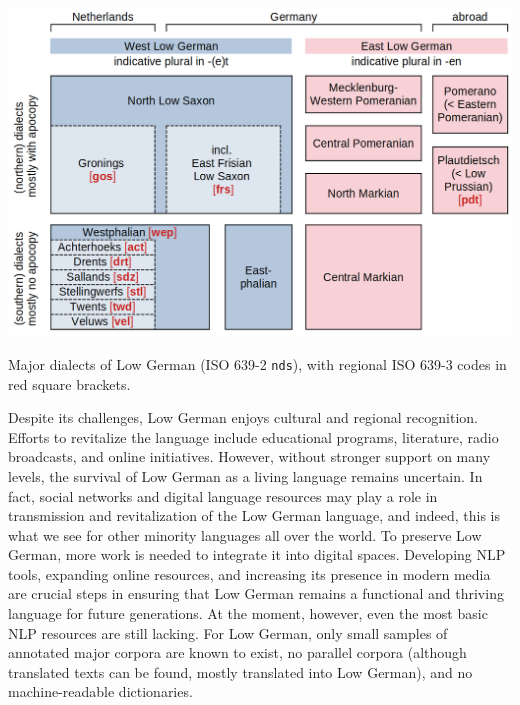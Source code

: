 \documentclass[11pt]{article}
\newcommand{\code}[1]{\texttt{#1}} %
\begin{document}
\begin{table}
    \centering
    \includegraphics[width=1.0\linewidth]{img/dialects-and-iso632-codes.png}
    \caption{Major dialects of Low German (ISO 639-2 \code{nds}), with regional ISO 639-3 codes in red square brackets.}
    \label{tab-dialects-and-isocodes}
\end{table}

Despite its challenges, Low German enjoys cultural and regional recognition. Efforts to revitalize the language include educational programs, literature, radio broadcasts, and online initiatives. However, without stronger support on many levels, the survival of Low German as a living language remains uncertain. In fact, social networks and digital language resources may play a role in transmission and revitalization of the Low German language, and indeed, this is what we see for other minority languages all over the world. 
To preserve Low German, more work is needed to integrate it into digital spaces. Developing NLP tools, expanding online resources, and increasing its presence in modern media are crucial steps in ensuring that Low German remains a functional and thriving language for future generations. At the moment, however, even the most basic NLP resources are still lacking. For Low German, only small samples of annotated major corpora are known to exist, no parallel corpora (although translated texts can be found, mostly translated into Low German), and no machine-readable dictionaries. 
\end{document}
